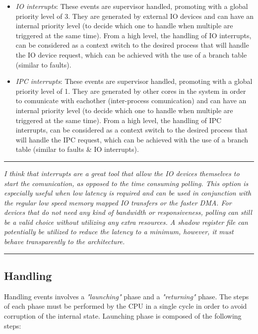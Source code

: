 \documentclass{article}
\begin{document}
            \begin{itemize}

                \item \textit{IO interrupts}: These events are supervisor handled, promoting with a global priority level of 3. They are generated by external IO devices and can have an internal priority level (to decide which one to handle when multiple are triggered at the same time). From a high level, the handling of IO interrupts, can be considered as a context switch to the desired process that will handle the IO device request, which can be achieved with the use of a branch table (similar to faults).
                \item \textit{IPC interrupts}: These events are supervisor handled, promoting with a global priority level of 1. They are generated by other cores in the system in order to comunicate with eachother (inter-process comunication) and can have an internal priority level (to decide which one to handle when multiple are triggered at the same time). From a high level, the handling of IPC interrupts, can be considered as a context switch to the desired process that will handle the IPC request, which can be achieved with the use of a branch table (similar to faults & IO interrupts).

            \end{itemize}

        \par\noindent\rule{\textwidth}{0.4pt}
        \textit{I think that interrupts are a great tool that allow the IO devices themselves to start the comunication, as opposed to the time consuming polling. This option is especially useful when low latency is required and can be used in conjunction with the regular low speed memory mapped IO transfers or the faster DMA. For devices that do not need any kind of bandwidth or responsiveness, polling can still be a valid choice without utilizing any extra resources. A shadow register file can potentially be utilized to reduce the latency to a minimum, however, it must behave transparently to the architecture.}
        \par\noindent\rule{\textwidth}{0.4pt}

        \subsection{Handling}

            Handling events involves a \textit{"launching"} phase and a \textit{"returning"} phase. The steps of each phase must be performed by the CPU in a single cycle in order to avoid corruption of the internal state. Launching phase is composed of the following steps:
\end{document}
